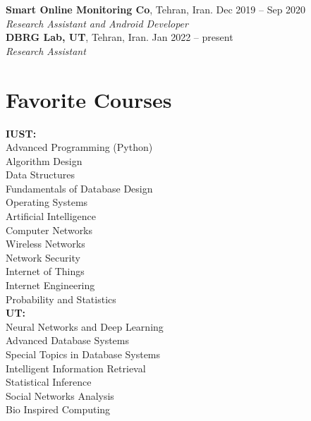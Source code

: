 \documentclass[margin,line]{res}
\begin{document}
\begin{resume}
{\bf Smart Online Monitoring Co}, Tehran, Iran. \hfill{Dec 2019 -- Sep 2020}\\
{\em Research Assistant and Android Developer  }\\

{\bf DBRG Lab, UT}, Tehran, Iran. \hfill{Jan 2022 -- present}\\
{\em Research Assistant  }\\

\section{\sc Favorite Courses}
{\bf  IUST:}\\
Advanced Programming (Python)\\
Algorithm Design\\
Data Structures\\
Fundamentals of Database Design\\
Operating Systems \\
Artificial Intelligence \\
Computer Networks\\
Wireless Networks\\
Network Security\\
Internet of Things \\
Internet Engineering\\
Probability and Statistics\\

{\bf UT:}\\
Neural Networks and Deep Learning\\
Advanced Database Systems\\
Special Topics in Database Systems\\
Intelligent Information Retrieval\\
Statistical Inference\\
Social Networks Analysis\\
Bio Inspired Computing\\

\end{resume}
\end{document}
